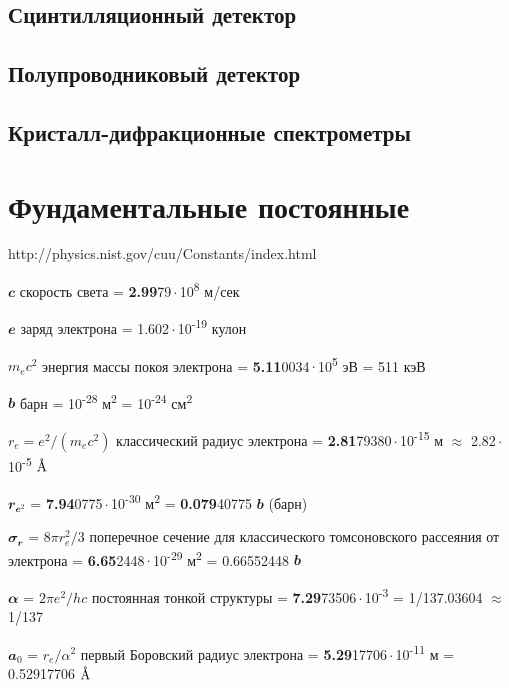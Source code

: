 \documentclass[a4paper,14pt, openany, twoside, draft]{extbook} %
\newcommand{\AAA}{\textup{\AA}}
\begin{document}
\section{Сцинтилляционный детектор}
\section{Полупроводниковый детектор}
\section{Кристалл-дифракционные спектрометры}

\newpage
\chapter*{Фундаментальные постоянные}
{http://physics.nist.gov/cuu/Constants/index.html}


$\mathbfit{c}$  скорость света =  \textbf{2.99}79\,$\cdot$\,10\textsuperscript{8} м/сек %

$\mathbfit{e}$  заряд электрона = 1.602\,$\cdot$\,10\textsuperscript{-19} кулон

$m_ec^2$  энергия массы покоя электрона = \textbf{5.11}0034\,$\cdot$\,10\textsuperscript{5} эВ = 511 кэВ

$\mathbfit{b}$  барн = 10\textsuperscript{-28} м\textsuperscript{2} = 10\textsuperscript{-24} см\textsuperscript{2}

$r_e=e^2/(m_ec^2)$  классический радиус электрона = \textbf{2.81}79380\,$\cdot$\,10\textsuperscript{-15} м $\approx$ 2.82\,$\cdot$\,10\textsuperscript{-5} $\AAA$

$\mathbfit{r_{e^2}}$ = \textbf{7.94}0775\,$\cdot$\,10\textsuperscript{-30} м\textsuperscript{2}  = \textbf{0.079}40775 $\mathbfit{b}$ (барн)

$\mathbfit{\sigma_r}$ = $8\pi r_e^2/3$ поперечное сечение для классического томсоновского рассеяния от электрона = \textbf{6.65}2448\,$\cdot$\,10\textsuperscript{-29} м\textsuperscript{2} = 0.66552448 $\mathbfit{b}$

$\mathbfit{\alpha}$ = $2\pi e^2/hc$ постоянная тонкой структуры = \textbf{7.29}73506\,$\cdot$\,10\textsuperscript{-3} = 1/137.03604 $\approx$ 1/137

$\mathbfit{a_0}$ = $r_e/\alpha^2$ первый Боровский радиус электрона  = \textbf{5.29}17706\,$\cdot$\,10\textsuperscript{-11} м = 0.52917706 $\AAA$
\end{document}

